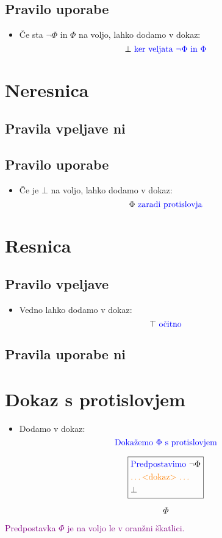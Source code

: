\documentclass[12pt,a4paper]{article}
\newcommand{\blue}[1]{\textcolor{blue}{#1}}
\newcommand{\orange}[1]{\textcolor{orange}{#1}}
\newcommand{\purple}[1]{\textcolor{purple}{#1}}
\newcommand{\dokaz}{\orange{\text{\ldots <dokaz> \ldots}}}
\newcommand{\skatlica}[1]{
    \begin{equation*}
        \boxed{
        \begin{aligned}
            #1
        \end{aligned}
        }
    \end{equation*}
}
\begin{document}
    \subsection{Pravilo uporabe}
    \begin{itemize}
        \item Če sta $ \neg \Phi $ in $ \Phi  $ na voljo, lahko dodamo v dokaz:
        $$  \bot \blue{\text{ ker veljata } \neg \Phi \text{ in } \Phi } $$
    \end{itemize}


\section{Neresnica}
    \subsection*{Pravila vpeljave ni}
    \subsection*{Pravilo uporabe}
    \begin{itemize}
        \item Če je $ \bot $ na voljo, lahko dodamo v dokaz:
        $$ \Phi \blue{\text{ zaradi protislovja}}  $$
    \end{itemize}

\section{Resnica}
    \subsection*{Pravilo vpeljave}
    \begin{itemize}
        \item Vedno lahko dodamo v dokaz:
        $$ \top \blue{\text{ očitno}}  $$
    \end{itemize}
    \subsection*{Pravila uporabe ni}

\section{Dokaz s protislovjem}
    \begin{itemize}
            \item Dodamo v dokaz:
            $$ \blue{\text{Dokažemo } \Phi \text{ s protislovjem}} $$
            \skatlica{
                &\blue{\text{Predpostavimo }} \neg \Phi \\ 
                &\dokaz \\ 
                &\bot 
            }
            $$ \Phi $$
    \end{itemize}
    \purple{Predpostavka $ \Phi $ je na voljo le v oranžni škatlici.}
\end{document}
